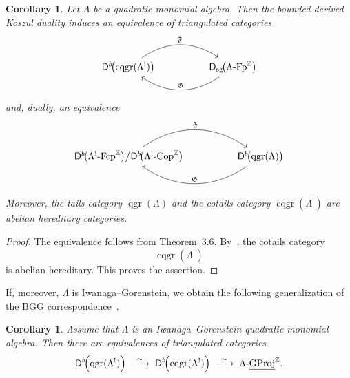 \documentclass[11pt]{article}
\newtheorem{corollary}[theorem]{Corollary}
\theoremstyle{definition}
\theoremstyle{remark}
\begin{document}
\begin{corollary}
Let \(\Lambda\) be a quadratic monomial algebra. Then the bounded derived
Koszul duality induces an equivalence of triangulated categories
\[
\begin{tikzcd}[column sep=huge]
\mathsf{D}^{b}\!\bigl(
\operatorname{cqgr}(\Lambda^{!})
\bigr)
\arrow[r, bend left=35, "\mathfrak{F}"]
&
\mathsf{D}_{\mathrm{sg}}\!\bigl(
\Lambda\textup{-}\mathrm{Fp}^{\mathbb{Z}}
\bigr)
\arrow[l, bend left=35, "\mathfrak{G}"']
\end{tikzcd}
\]
and, dually, an equivalence
\[
\begin{tikzcd}[column sep=huge]
\mathsf{D}^{b}\!\bigl(
\Lambda^{!}\textup{-}\mathrm{Fcp}^{\mathbb{Z}}
\bigr)
\big/
\mathsf{D}^{b}\!\bigl(\Lambda^{!}\textup{-Cop}^{\mathbb{Z}}\bigr)
\arrow[r, bend left=35, "\mathfrak{F}"]
&
\mathsf{D}^{b}\!\bigl(
\operatorname{qgr}(\Lambda)
\bigr)
\arrow[l, bend left=35, "\mathfrak{G}"']
\end{tikzcd}
\]
Moreover, the tails category \(\operatorname{qgr}(\Lambda)\) and the cotails
category \(\operatorname{cqgr}(\Lambda^{!})\) are abelian hereditary
categories.
\end{corollary}

\begin{proof}
The equivalence follows from Theorem~3.6. By~\cite[Corollary~3.9]{10}, the cotails category
\[
\operatorname{cqgr}(\Lambda^{!})
\]
is abelian hereditary. This proves the assertion.
\end{proof}
If, moreover, \(\Lambda\) is Iwanaga--Gorenstein, we obtain the following
generalization of the BGG correspondence~\cite[Theorem~3.17]{8}.

\begin{corollary}
Assume that \(\Lambda\) is an Iwanaga--Gorenstein quadratic monomial algebra.
Then there are equivalences of triangulated categories
\[
\mathsf{D}^{b}\!\Bigl(
\operatorname{qgr}(\Lambda^{!})
\Bigr)
\;\xrightarrow{\ \sim\ }\;
\mathsf{D}^{b}\!\Bigl(
\operatorname{cqgr}(\Lambda^{!})
\Bigr)
\;\xrightarrow{\ \sim\ }\;
\Lambda\textup{-}\underline{\mathrm{GProj}}^{\mathbb Z} .
\]
\end{corollary}
\end{document}
